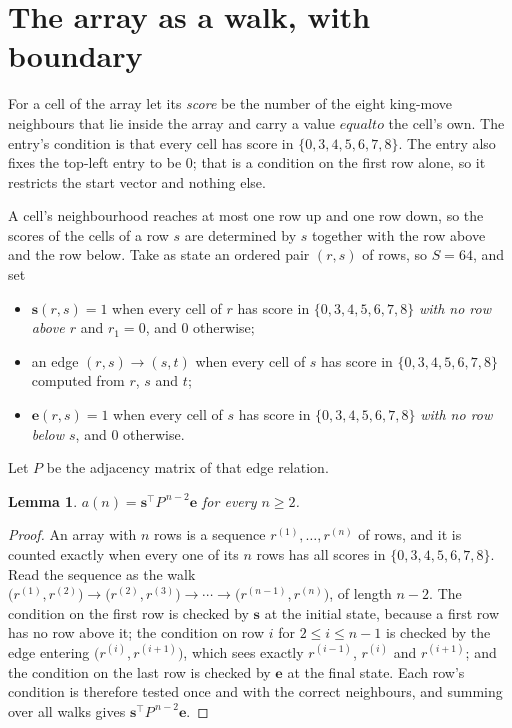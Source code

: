 \documentclass[11pt,a4paper]{article}
\theoremstyle{plain}
\newtheorem{lemma}[theorem]{Lemma}
\theoremstyle{definition}
\begin{document}
\section{The array as a walk, with boundary}

For a cell of the array let its \emph{score} be the number of the eight king-move neighbours that lie inside
the array and carry a value $equal to$ the cell's own. The entry's condition is that every cell
has score in $\{0,3,4,5,6,7,8\}$. The entry also fixes the top-left entry to be $0$; that is a condition on the first row alone, so it restricts the start vector and nothing else.

A cell's neighbourhood reaches at most one row up and one row down, so the scores of the
cells of a row $s$ are determined by $s$ together with the row above and the row below.
Take as state an ordered pair $(r,s)$ of rows, so $S=64$, and set
\begin{itemize}
\item $\mathbf{s}(r,s)=1$ when every cell of $r$ has score in $\{0,3,4,5,6,7,8\}$ \emph{with no row
above $r$} and $r_1=0$, and $0$ otherwise;
\item an edge $(r,s)\to(s,t)$ when every cell of $s$ has score in $\{0,3,4,5,6,7,8\}$ computed from
$r$, $s$ and $t$;
\item $\mathbf{e}(r,s)=1$ when every cell of $s$ has score in $\{0,3,4,5,6,7,8\}$ \emph{with no row
below $s$}, and $0$ otherwise.
\end{itemize}
Let $P$ be the adjacency matrix of that edge relation.

\begin{lemma}\label{lem:walk}
$a(n)=\mathbf{s}^{\!\top}P^{\,n-2}\mathbf{e}$ for every $n\ge2$.
\end{lemma}

\begin{proof}
An array with $n$ rows is a sequence $r^{(1)},\dots,r^{(n)}$ of rows, and it is counted
exactly when every one of its $n$ rows has all scores in $\{0,3,4,5,6,7,8\}$. Read the sequence as the
walk $\bigl(r^{(1)},r^{(2)}\bigr)\to\bigl(r^{(2)},r^{(3)}\bigr)\to\cdots\to
\bigl(r^{(n-1)},r^{(n)}\bigr)$, of length $n-2$. The condition on the first row is
checked by $\mathbf{s}$ at the initial state, because a first row has no row above it; the
condition on row $i$ for $2\le i\le n-1$ is checked by the edge entering
$\bigl(r^{(i)},r^{(i+1)}\bigr)$, which sees exactly $r^{(i-1)}$, $r^{(i)}$ and
$r^{(i+1)}$; and the condition on the last row is checked by $\mathbf{e}$ at the final
state. Each row's condition is therefore tested once and with the correct neighbours, and
summing over all walks gives $\mathbf{s}^{\!\top}P^{\,n-2}\mathbf{e}$.
\end{proof}
\end{document}

